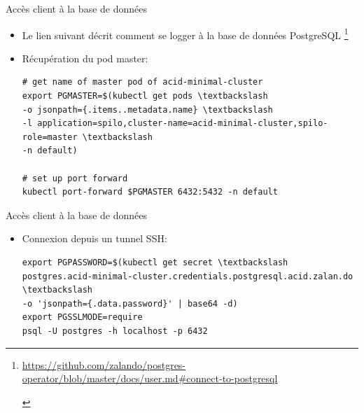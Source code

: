 \begin{frame}[fragile]{Accès client à la base de données}

   \begin{itemize}
      \item Le lien suivant décrit comment se logger à la base de données PostgreSQL \footnote{
            \begin{tcolorbox}
            \tiny{\url{https://github.com/zalando/postgres-operator/blob/master/docs/user.md\#connect-to-postgresql}}
            \end{tcolorbox}
         }
      \item Récupération du pod master:
\begin{tiny}
\begin{Verbatim}[commandchars=\\\{\}]
# get name of master pod of acid-minimal-cluster
export PGMASTER=$(kubectl get pods \textbackslash
-o jsonpath={.items..metadata.name} \textbackslash
-l application=spilo,cluster-name=acid-minimal-cluster,spilo-role=master \textbackslash
-n default)

# set up port forward
kubectl port-forward $PGMASTER 6432:5432 -n default
\end{Verbatim}
\end{tiny}
   \end{itemize}

\end{frame}


\begin{frame}[fragile]{Accès client à la base de données}

   \begin{itemize}
      \item Connexion depuis un tunnel SSH:
\begin{tiny}
\begin{Verbatim}[commandchars=\\\{\}]
export PGPASSWORD=$(kubectl get secret \textbackslash
postgres.acid-minimal-cluster.credentials.postgresql.acid.zalan.do \textbackslash
-o 'jsonpath={.data.password}' | base64 -d)
export PGSSLMODE=require
psql -U postgres -h localhost -p 6432
\end{Verbatim}
\end{tiny}
   \end{itemize}

\end{frame}

